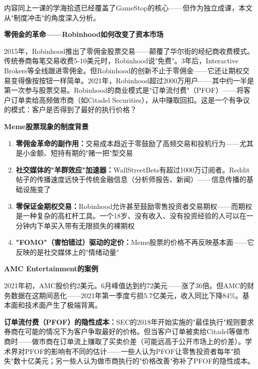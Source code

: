 \documentclass[a4paper,11pt]{ctexbook}
\begin{document}
内容同上一课的学海拾遗已经覆盖了GameStop的核心——但作为独立成课，本文从"制度冲击"的角度深入分析。

\begin{scenario}
\textbf{零佣金的革命——Robinhood如何改变了资本市场}

2015年，Robinhood推出了零佣金股票交易——颠覆了华尔街的经纪商收费模式。传统券商每笔交易收费5-10美元时，Robinhood说"免费"。3年后，Interactive Brokers等全线跟进零佣金。但Robinhood的创新不止于零佣金——它还让期权交易变得像按按钮一样简单。2021年，Robinhood超过2000万用户——其中约一半是第一次参与股票交易。Robinhood的商业模式是"订单流付费"（PFOF）——将客户订单卖给高频做市商（如Citadel Securities），从中赚取回扣。这是一个有争议的模式：客户是否得到了最好的执行价格？
\end{scenario}

\begin{qualitative}
\textbf{Meme股票现象的制度背景}

\begin{enumerate}
  \item \textbf{零佣金革命的副作用：}交易成本趋近于零鼓励了高频交易和投机行为——尤其是小金额、短持有期的"赌一把"型交易
  \item \textbf{社交媒体的"羊群效应"加速器：}WallStreetBets有超过1000万订阅者。Reddit帖子的传播速度远快于传统金融信息（分析师报告、新闻）——信息传播的基础设施变了
  \item \textbf{零保证金期权交易：}Robinhood允许甚至鼓励零售投资者交易期权——而期权是一种复杂的高杠杆工具。一个18岁、没有收入、没有投资经验的人可以在一分钟内下单买入带有无限损失的裸期权
  \item \textbf{"FOMO"（害怕错过）驱动的定价：}Meme股票的价格不再反映基本面——它反映的是社交媒体上的"情绪动量"
\end{enumerate}
\end{qualitative}

\begin{quantitative}
\textbf{AMC Entertainment的案例}

2021年初，AMC股价约2美元。6月峰值达到约72美元——涨了36倍。但AMC的财务数据在这期间恶化——2021年第一季度亏损5.7亿美元，收入同比下降84\%。基本面和技术面产生了极端背离。

\textbf{订单流付费（PFOF）的隐性成本：}SEC的2018年开始实施的"最佳执行"规则要求券商在可能的情况下为客户争取最好的价格。但当客户订单被卖给Citadel等做市商时——做市商在订单流上赚取了买卖价差（可能远高于公开市场上的价差）。学术界对PFOF的影响有不同的估计——一些人认为PFOF让零售投资者每年"损失"数十亿美元；另一些人认为做市商执行的"价格改善"弥补了PFOF的隐性成本。
\end{quantitative}
\end{document}
